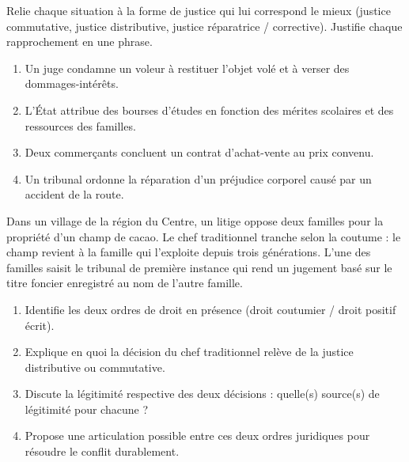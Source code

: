 \documentclass[11pt]{article}
\newcounter{popsec}
\newcounter{popsub}
\newcommand{\courssub}[1]{%
  \stepcounter{popsub}%
  \par\vspace{9pt}\noindent{\popxbold\fontsize{11.5}{13}\selectfont\color{popink}{\color{poporange}\thepopsec.\thepopsub}\hspace{6pt}#1}\par\nopagebreak\vspace{4pt}
}
\begin{document}
\begin{exercice}
Relie chaque situation à la forme de justice qui lui correspond le mieux (justice commutative, justice distributive, justice réparatrice / corrective). Justifie chaque rapprochement en une phrase.
\begin{enumerate}
\item Un juge condamne un voleur à restituer l'objet volé et à verser des dommages-intérêts.
\item L'État attribue des bourses d'études en fonction des mérites scolaires et des ressources des familles.
\item Deux commerçants concluent un contrat d'achat-vente au prix convenu.
\item Un tribunal ordonne la réparation d'un préjudice corporel causé par un accident de la route.
\end{enumerate}
\end{exercice}

\courssub{Je m'entraîne}

\begin{exercice}
Dans un village de la région du Centre, un litige oppose deux familles pour la propriété d'un champ de cacao. Le chef traditionnel tranche selon la coutume : le champ revient à la famille qui l'exploite depuis trois générations. L'une des familles saisit le tribunal de première instance qui rend un jugement basé sur le titre foncier enregistré au nom de l'autre famille.
\begin{enumerate}
\item Identifie les deux ordres de droit en présence (droit coutumier / droit positif écrit).
\item Explique en quoi la décision du chef traditionnel relève de la justice distributive ou commutative.
\item Discute la légitimité respective des deux décisions : quelle(s) source(s) de légitimité pour chacune ?
\item Propose une articulation possible entre ces deux ordres juridiques pour résoudre le conflit durablement.
\end{enumerate}
\end{exercice}
\end{document}
